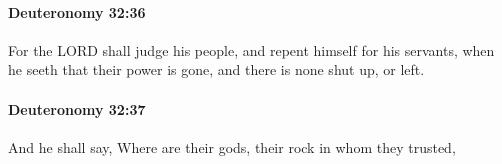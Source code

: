 		\paragraph{Deuteronomy 32:36} %
			\label{DEUTERONOMY-32-36}

			For the LORD shall judge his people, and repent himself for his servants, when he seeth that their power is gone, and there is none shut up, or left.


		\paragraph{Deuteronomy 32:37} %
			\label{DEUTERONOMY-32-37}

			And he shall say, Where are their gods, their rock in whom they trusted,


